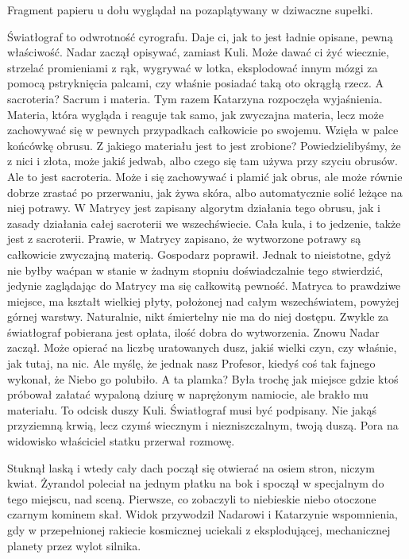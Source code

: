 Fragment papieru u dołu wyglądał na pozaplątywany w dziwaczne supełki.

\begin{dialogue}
\ds{} Światłograf to odwrotność cyrografu. Daje ci, jak to jest ładnie opisane, pewną właściwość. \dm{} Nadar zaczął opisywać, zamiast Kuli. \dm{}
Może dawać ci żyć wiecznie, strzelać promieniami z rąk, wygrywać w lotka, eksplodować innym mózgi za pomocą pstryknięcia palcami, czy właśnie posiadać taką oto okrągłą rzecz.
\ds{} A sacroteria? 
\ds{} Sacrum i materia. \dm{} Tym razem Katarzyna rozpoczęła wyjaśnienia. \dm{} 
Materia, która wygląda i reaguje tak samo, jak zwyczajna materia, lecz może zachowywać się w pewnych przypadkach całkowicie po swojemu. \dm{} 
Wzięła w palce końcówkę obrusu. \dm{} Z jakiego materiału jest to jest zrobione? 
Powiedzielibyśmy, że z nici i złota, może jakiś jedwab, albo czego się tam używa przy szyciu obrusów.
Ale to jest sacroteria. Może i się zachowywać i plamić jak obrus, ale może równie dobrze zrastać po przerwaniu, jak żywa skóra, albo automatycznie solić leżące na niej potrawy.
W Matrycy jest zapisany algorytm działania tego obrusu, jak i zasady działania całej sacroterii we wszechświecie. 
Cała kula, i to jedzenie, także jest z sacroterii.
\ds{} Prawie, w Matrycy zapisano, że wytworzone potrawy są całkowicie zwyczajną materią. \dm{} Gospodarz poprawił. \dm{}
Jednak to nieistotne, gdyż nie byłby waćpan w stanie w żadnym stopniu doświadczalnie tego stwierdzić, jedynie zaglądając do Matrycy ma się całkowitą pewność. 
Matryca to prawdziwe miejsce, ma kształt wielkiej płyty, położonej nad całym wszechświatem, powyżej górnej warstwy. Naturalnie, nikt śmiertelny nie ma do niej dostępu.
\ds{} Zwykle za światłograf pobierana jest opłata, ilość dobra do wytworzenia. \dm{} Znowu Nadar zaczął. \dm{} 
Może opierać na liczbę uratowanych dusz, jakiś wielki czyn, czy właśnie, jak tutaj, na nic. 
Ale myślę, że jednak nasz Profesor, kiedyś coś tak fajnego wykonał, że Niebo go polubiło.
\ds{} A ta plamka? \dm{} Była trochę jak miejsce gdzie ktoś próbował załatać wypaloną dziurę w naprężonym namiocie, ale brakło mu materiału.
\ds{} To odcisk duszy Kuli. Światłograf musi być podpisany. Nie jakąś przyziemną krwią, lecz czymś wiecznym i niezniszczalnym, twoją duszą.
\ds{} Pora na widowisko \dm{} właściciel statku przerwał rozmowę.
\end{dialogue}

Stuknął laską i wtedy cały dach począł się otwierać na osiem stron, niczym kwiat. 
Żyrandol poleciał na jednym płatku na bok i spoczął w specjalnym do tego miejscu, nad sceną.
Pierwsze, co zobaczyli to niebieskie niebo otoczone czarnym kominem skał.
Widok przywodził Nadarowi i Katarzynie wspomnienia, gdy w przepełnionej rakiecie kosmicznej uciekali z eksplodującej, mechanicznej planety przez wylot silnika.


